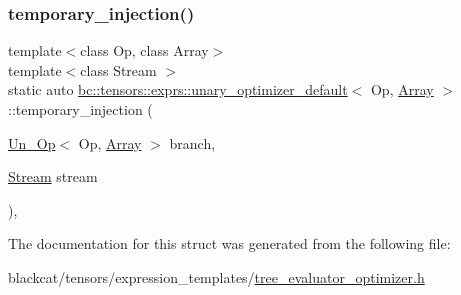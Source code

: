 \subsubsection{\texorpdfstring{temporary\+\_\+injection()}{temporary\_injection()}}
{\footnotesize\ttfamily template$<$class Op, class Array$>$ \\
template$<$class Stream $>$ \\
static auto \hyperlink{structbc_1_1tensors_1_1exprs_1_1unary__optimizer__default}{bc\+::tensors\+::exprs\+::unary\+\_\+optimizer\+\_\+default}$<$ Op, \hyperlink{structbc_1_1tensors_1_1exprs_1_1Array}{Array} $>$\+::temporary\+\_\+injection (\begin{DoxyParamCaption}\item[{\hyperlink{structbc_1_1tensors_1_1exprs_1_1Un__Op}{Un\+\_\+\+Op}$<$ Op, \hyperlink{structbc_1_1tensors_1_1exprs_1_1Array}{Array} $>$}]{branch,  }\item[{\hyperlink{classbc_1_1streams_1_1Stream}{Stream}}]{stream }\end{DoxyParamCaption})\hspace{0.3cm}{\ttfamily [inline]}, {\ttfamily [static]}}



The documentation for this struct was generated from the following file\+:\begin{DoxyCompactItemize}
\item 
blackcat/tensors/expression\+\_\+templates/\hyperlink{tree__evaluator__optimizer_8h}{tree\+\_\+evaluator\+\_\+optimizer.\+h}\end{DoxyCompactItemize}
